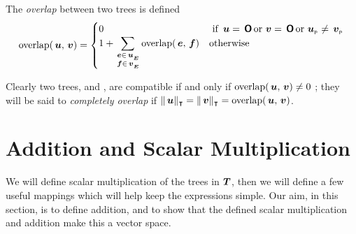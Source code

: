 \begin{definition}
The \emph{overlap} between two trees is defined
\[
  \operatorname{overlap}(\,\boldsymbol{u},\,\boldsymbol{v}) = \begin{cases}
    0 & \text{ if } \,\boldsymbol{u} = \,\boldsymbol{\mathsf{O}} \operatorname{\text{or}} \,\boldsymbol{v} = \,\boldsymbol{\mathsf{O}} \operatorname{\text{or}} {\,\boldsymbol{u}}_{{}_{\mathsf{P}}} \neq {\,\boldsymbol{v}}_{{}_{\mathsf{P}}} \\
    1 + \displaystyle\sum_{\substack{\,\boldsymbol{e}\in{\,\boldsymbol{u}}_{{}_{\boldsymbol{E}}} \\ \,\boldsymbol{f}\in{\,\boldsymbol{v}}_{{}_{\boldsymbol{E}}}}} \operatorname{overlap}(\,\boldsymbol{e},\,\boldsymbol{f}) & \text{otherwise}
  \end{cases}
\]

Clearly two trees,  and , are compatible if and only if \(\operatorname{overlap}(\,\boldsymbol{u},\,\boldsymbol{v}) \neq 0 \) ; they will
be said to \emph{completely overlap} if \(\lVert{\,\boldsymbol{u}}\rVert_{\intercal} = \lVert{\,\boldsymbol{v}}\rVert_{\intercal} =
\operatorname{overlap}(\,\boldsymbol{u},\,\boldsymbol{v})\).
\end{definition}


    


\section{Addition and Scalar Multiplication}
We will define scalar multiplication of the trees in $\boldsymbol{T}$, then  we will define a few useful mappings which will help keep the expressions simple. Our aim, in this section, is
to define addition, and to show that the defined scalar multiplication and addition make this a vector space.

